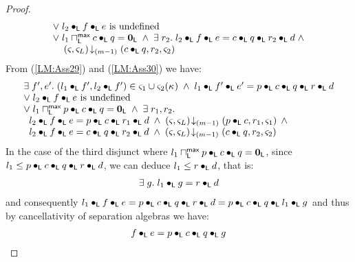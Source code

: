 \begin{lemma}[]
\begin{proof}
\begin{align}
\begin{array}{l}
		\lor\;l_2 \bullet_{\textsf{L}} f \bullet_{\textsf{L}} e \text{ is undefined}\\
		\lor\; l_1 \sqcap_{\textsf{L}}^{\textsf{max}} c \bullet_{\textsf{L}} q  = \mathbf{0}_{\textsf{L}} \;\land\;  \exists\; r_2.\; l_2 \bullet_{\textsf{L}} f \bullet_{\textsf{L}} e = c \bullet_{\textsf{L}} q \bullet_{\textsf{L}} r_2 \bullet_{\textsf{L}} d \;\land\\
		\hspace*{0.4cm} \left(\varsigma_{}, \varsigma_{L}\right) \!\downarrow_{(m-1)} \left(c \bullet_{\textsf{L}} q, r_2, \varsigma_{2} \right)
	\end{array} \label{LM:Ass30}
\end{align}
From (\ref{LM:Ass29}) and (\ref{LM:Ass30}) we have:
%
\begin{align}
	\begin{array}{l}
		\exists\; f', e'.\; (l_1 \bullet_{\textsf{L}} f', l_2 \bullet_{\textsf{L}} f') \in \varsigma_{1} \cup \varsigma_{2}(\kappa_{}) \;\land\; l_1 \bullet_{\textsf{L}} f' \bullet_{\textsf{L}} e' =  p \bullet_{\textsf{L}} c \bullet_{\textsf{L}} q \bullet_{\textsf{L}} r \bullet_{\textsf{L}} d\\
		\lor\;l_2 \bullet_{\textsf{L}} f \bullet_{\textsf{L}} e \text{ is undefined}\\
		\lor\; l_1 \sqcap_{\textsf{L}}^{\textsf{max}} p \bullet_{\textsf{L}} c \bullet_{\textsf{L}} q  = \mathbf{0}_{\textsf{L}} \;\land\; \exists\; r_1, r_2.\;\\
		\hspace*{0.2cm} l_2 \bullet_{\textsf{L}} f \bullet_{\textsf{L}} e = p \bullet_{\textsf{L}} c \bullet_{\textsf{L}} r_1 \bullet_{\textsf{L}} d \;\land\;
		\left(\varsigma_{}, \varsigma_{L}\right) \!\downarrow_{(m-1)} \left(p \bullet_{\textsf{L}} c, r_1, \varsigma_{1} \right)\;\land\\
		\hspace*{0.2cm} l_2 \bullet_{\textsf{L}} f \bullet_{\textsf{L}} e = c \bullet_{\textsf{L}} q \bullet_{\textsf{L}} r_2 \bullet_{\textsf{L}} d \;\land\;
		\left(\varsigma_{}, \varsigma_{L}\right) \!\downarrow_{(m-1)} \left(c \bullet_{\textsf{L}} q, r_2, \varsigma_{2} \right)
	\end{array}
	\label{LM:Ass31}
\end{align}
In the case of the third disjunct where $l_1 \sqcap_{\textsf{L}}^{\textsf{max}} p \bullet_{\textsf{L}} c \bullet_{\textsf{L}} q  = \mathbf{0}_{\textsf{L}} $, since $l_1 \leq p \bullet_{\textsf{L}} c \bullet_{\textsf{L}} q \bullet_{\textsf{L}} r \bullet_{\textsf{L}} d$, we can deduce $l_1 \leq r \bullet_{\textsf{L}} d$, that is:
%
\begin{align}
	\begin{array}{l l}
		\exists\; g.\; l_1 \bullet_{\textsf{L}} g = r \bullet_{\textsf{L}} d
	\end{array} \nonumber
\end{align}
%
and consequently $l_1 \bullet_{\textsf{L}} f \bullet_{\textsf{L}} e = p \bullet_{\textsf{L}} c \bullet_{\textsf{L}} q \bullet_{\textsf{L}} r \bullet_{\textsf{L}} d = p \bullet_{\textsf{L}} c \bullet_{\textsf{L}} q \bullet_{\textsf{L}} l_1 \bullet_{\textsf{L}} g$
%
and thus by cancellativity of separation algebras we have: 
\begin{align}
	f \composeL e = p \composeL c \composeL q \composeL g \label{LM:Ass32}

\end{align}
\end{proof}
\end{lemma}
